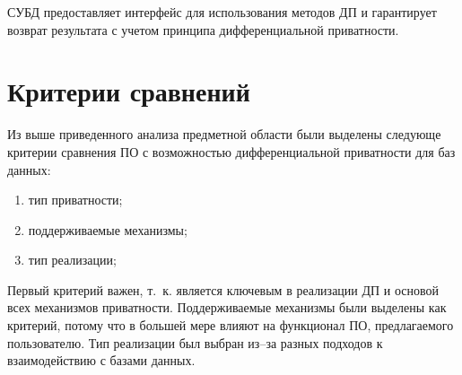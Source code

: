 СУБД предоставляет интерфейс для использования методов ДП и гарантирует возврат результата с учетом принципа дифференциальной приватности.~\cite{main}






\section{Критерии сравнений}

Из выше приведенного анализа предметной области были выделены следующе критерии сравнения ПО с возможностью дифференциальной приватности для баз данных:
\begin{enumerate}[label*=---]
	\item тип приватности; 
	\item поддерживаемые механизмы;
	\item тип реализации;
\end{enumerate}
Первый критерий важен, т.~к. является ключевым в реализации ДП и основой всех механизмов приватности.
Поддерживаемые механизмы были выделены как критерий, потому что в большей мере влияют на функционал ПО, предлагаемого пользователю.
Тип реализации был выбран из--за разных подходов к взаимодействию с базами данных.


